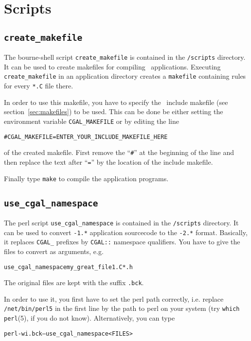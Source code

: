 \section{Scripts}

\subsection{\texttt{create\_makefile}}\label{sec:create_cgal_makefile}

The bourne-shell script \texttt{create\_makefile} is contained in the
\cgaldir\texttt{/scripts} directory. It can be used to create
makefiles for compiling \cgal\ applications. Executing
\texttt{create\_makefile} in an application directory creates a
\texttt{makefile} containing rules for every \texttt{*.C} file there.

In order to use this makefile, you have to specify the \cgal\ include
makefile (see section~\ref{sec:makefiles}) to be used. This can be
done be either setting the environment variable
\texttt{CGAL\_MAKEFILE} or by editing the line
\begin{alltt}
  # CGAL_MAKEFILE = ENTER_YOUR_INCLUDE_MAKEFILE_HERE
\end{alltt}
of the created makefile. First remove the ``\texttt{\#}'' at the
beginning of the line and then replace the text after ``\texttt{=}''
by the location of the include makefile. 

Finally type \texttt{make} to compile the application programs.

\subsection{\texttt{use\_cgal\_namespace}}\label{sec:use_cgal_namespace}

The perl script \texttt{use\_cgal\_namespace} is contained in the
\cgaldir\texttt{/scripts} directory. It can be used to convert
\cgal\texttt{-1.*} application sourcecode to the \cgal\texttt{-2.*}
format.  Basically, it replaces \texttt{CGAL\_} prefixes by
\texttt{CGAL::} namespace qualifiers. You have to give the files to
convert as arguments, e.g.
\begin{alltt}
  use_cgal_namespace my_great_file1.C *.h
\end{alltt}
The original files are kept with the suffix \texttt{.bck}.

In order to use it, you first have to set the perl path correctly,
i.e. replace \texttt{/net/bin/perl5} in the first line by the path to
perl on your system (try \texttt{which perl}(5), if you do not know).
Alternatively, you can type
\begin{alltt}
  perl -wi.bck -- use_cgal_namespace <FILES>
\end{alltt}

\lcTex{\end{appendix}}



